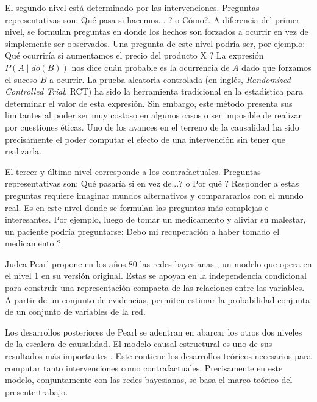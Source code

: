 \begin{introduction}
	El segundo nivel está determinado por las intervenciones. Preguntas representativas son: \textquestiondown Qué pasa si hacemos... ? o \textquestiondown Cómo?. A diferencia del primer nivel, se formulan preguntas en donde los hechos son forzados a ocurrir en vez de simplemente ser observados. Una pregunta de este nivel podría ser, por ejemplo: \textquestiondown Qué ocurriría si aumentamos el precio del producto X ? La expresión $P(A\mid do(B))$ nos dice cuán probable es la ocurrencia de $A$ dado que forzamos el suceso $B$ a ocurrir. La prueba aleatoria controlada (en inglés, \textit{Randomized Controlled Trial}, RCT) ha sido la herramienta tradicional en la estadística para determinar el valor de esta expresión. Sin embargo, este método presenta sus limitantes al poder ser muy costoso en algunos casos o ser imposible de realizar por cuestiones éticas. Uno de los avances en el terreno de la causalidad ha sido precisamente el poder computar el efecto de una intervención sin tener que realizarla.
	
	El tercer y último nivel corresponde a los contrafactuales. Preguntas representativas  son: \textquestiondown Qué pasaría si en vez de...? o \textquestiondown Por qué ? Responder a estas preguntas requiere imaginar mundos alternativos y comparararlos con el mundo real. Es en este nivel donde se formulan las preguntas más complejas e interesantes. Por ejemplo, luego de tomar un medicamento y aliviar su malestar, un paciente podría preguntarse: \textquestiondown Debo mi recuperación a haber tomado el medicamento ? \cite{PearlMackenzie18}
	
	Judea Pearl propone en los años 80 las redes bayesianas \cite{pearl1985bayesian}, un modelo que opera en el nivel 1 en su versión original. Estas se apoyan en la independencia condicional para construir una representación compacta de las relaciones entre las variables. A partir de un conjunto de evidencias, permiten estimar la probabilidad conjunta de un conjunto de variables de la red.
	
	Los desarrollos posteriores de Pearl se adentran en abarcar los otros dos niveles de la escalera de causalidad. El modelo causal estructural es uno de sus resultados más importantes \cite{pearl2016causal}. Este contiene los desarrollos teóricos necesarios para computar tanto intervenciones como contrafactuales. Precisamente en este modelo, conjuntamente con las redes bayesianas, se basa el marco teórico del presente trabajo.
	

\end{introduction}

